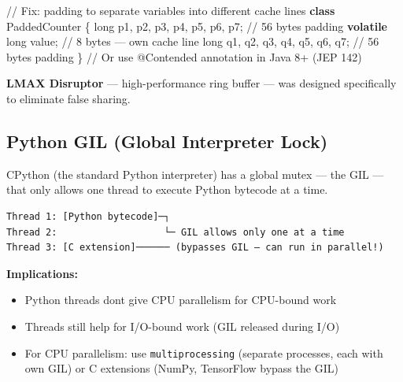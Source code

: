 \documentclass[11pt]{article}
\providecommand{\tightlist}{\setlength{\itemsep}{1pt}\setlength{\parskip}{0pt}}
\newenvironment{Shaded}{\begin{snugshade}}{\end{snugshade}}
\newcommand{\CommentTok}[1]{\textcolor[rgb]{0.48,0.49,0.49}{#1}}
\newcommand{\DataTypeTok}[1]{\textcolor[rgb]{0.16,0.50,0.73}{#1}}
\newcommand{\KeywordTok}[1]{\textcolor[rgb]{0.81,0.81,0.76}{\textbf{#1}}}
\newcommand{\NormalTok}[1]{\textcolor[rgb]{0.81,0.81,0.76}{#1}}
\newcommand{\OperatorTok}[1]{\textcolor[rgb]{0.81,0.81,0.76}{#1}}
\begin{document}
\begin{Shaded}
\begin{Highlighting}[]
\CommentTok{// Fix: padding to separate variables into different cache lines}
\KeywordTok{class}\NormalTok{ PaddedCounter }\OperatorTok{\{}
    \DataTypeTok{long}\NormalTok{ p1}\OperatorTok{,}\NormalTok{ p2}\OperatorTok{,}\NormalTok{ p3}\OperatorTok{,}\NormalTok{ p4}\OperatorTok{,}\NormalTok{ p5}\OperatorTok{,}\NormalTok{ p6}\OperatorTok{,}\NormalTok{ p7}\OperatorTok{;} \CommentTok{// 56 bytes padding}
    \KeywordTok{volatile} \DataTypeTok{long}\NormalTok{ value}\OperatorTok{;}               \CommentTok{// 8 bytes — own cache line}
    \DataTypeTok{long}\NormalTok{ q1}\OperatorTok{,}\NormalTok{ q2}\OperatorTok{,}\NormalTok{ q3}\OperatorTok{,}\NormalTok{ q4}\OperatorTok{,}\NormalTok{ q5}\OperatorTok{,}\NormalTok{ q6}\OperatorTok{,}\NormalTok{ q7}\OperatorTok{;} \CommentTok{// 56 bytes padding}
\OperatorTok{\}}
\CommentTok{// Or use @Contended annotation in Java 8+ (JEP 142)}
\end{Highlighting}
\end{Shaded}

\textbf{LMAX Disruptor} --- high-performance ring buffer --- was designed specifically to eliminate false sharing.

\subsection{Python GIL (Global Interpreter Lock)}\label{python-gil-global-interpreter-lock}

CPython (the standard Python interpreter) has a global mutex --- the GIL --- that only allows one thread to execute Python bytecode at a time.

\setcodelang{}

\begin{verbatim}
Thread 1: [Python bytecode]─┐
Thread 2:                   └─ GIL allows only one at a time
Thread 3: [C extension]────── (bypasses GIL — can run in parallel!)
\end{verbatim}

\textbf{Implications:}

\begin{itemize}
\tightlist
\item
  Python threads don\textquotesingle t give CPU parallelism for CPU-bound work
\item
  Threads still help for I/O-bound work (GIL released during I/O)
\item
  For CPU parallelism: use \texttt{multiprocessing} (separate processes, each with own GIL) or C extensions (NumPy, TensorFlow bypass the GIL)
\end{itemize}
\end{document}
